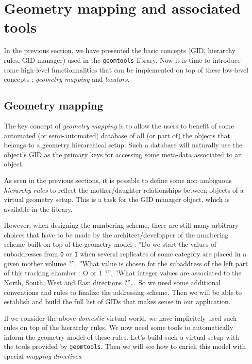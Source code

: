 
\section{Geometry mapping and associated tools}

\pn  In the  previous section,  we have  presented the  basic concepts
(GID,  hierarchy rules,  GID manager)  used in  the \texttt{geomtools}
library.  Now it is time to introduce some high-level functionnalities
that  can  be  implemented  on  top  of  these  low-level  concepts  :
\emph{geometry mapping} and \emph{locators}.

\subsection{Geometry mapping}

The key  concept of \emph{geometry mapping}  is to allow  the users to
benefit of some automated (or semi-automated) database of all (or part
of) the objects that belongs  to a geometry hierarchical setup. Such a
database will naturally  use the object's GID as  the primary keys for
accessing some meta-data associated to an object.

As seen  in the previous sections,  it is possible to  define some non
ambiguous  \emph{hierarchy  rules}   to  reflect  the  mother/daughter
relationships between objects  of a virtual geometry setup.  This is a
task  for  the   GID  manager  object,  which  is   available  in  the
library. 

However,  when designing the  numbering scheme,  there are  still many
arbitrary choices that have to  be made by the architect/developper of
the numbering  scheme built  on top  of the geometry  model :  ''Do we
start the  values of subaddresses  from \texttt{0} or  \texttt{1} when
several  replicates of  some category  are  placed in  a given  mother
volume ?'', ''What value is chosen for the subaddress of the left part
of  this tracking  chamber :  O or  1 ?'',  ''What integer  values are
associated to the North, South, West and East directions ?''\dots \ So
we  need  some  additional  conventions  and  rules  to  finalize  the
addressing scheme.  Then we  will be able  to establish and  build the
full list of GIDs that makes sense in our application.

If  we  consider the  above  \emph{domestic}  virtual  world, we  have
implicitely used such rules on top of the hierarchy rules. We now need
some tools to automatically inform  the geometry model of these rules.
Let's  build  such  a  virtual   setup  with  the  tools  provided  by
\texttt{geomtools}. Then  we will  see how to  enrich this  model with
special \emph{mapping directives}.

